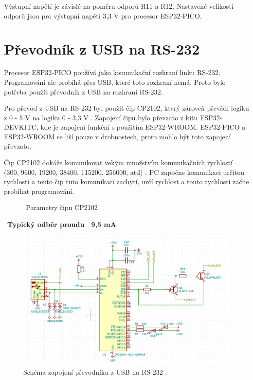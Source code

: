   Výstupní napětí je závislé na poměru odporů R11 a R12. Nastavené velikosti odporů jsou pro výstupní napětí 3,3 V pro procesor 
  ESP32-PICO.

  \section{Převodník z USB na RS-232}
  Procesor ESP32-PICO používá jako komunikační rozhraní linku RS-232. Programování ale probíhá přes USB, které toto rozhraní
  nemá. Proto bylo potřeba použít převodník z USB na rozhraní RS-232.
  
  Pro převod z USB na RS-232 byl použit čip CP2102, který  zároveň převádí logiku z 0 - 5 V na logiku 0 - 3,3 V 
  \cite{CP2102_datasheet}. Zapojení čipu bylo převzato z kitu ESP32-DEVKITC, kde je zapojení funkční s použitím ESP32-WROOM.
  ESP32-PICO a ESP32-WROOM se liší pouze v drobnostech, proto mohlo být toto zapojení převzato.

  Čip CP2102 dokáže komunikovat vekým množstvím komunikačních rychlostí (300, 9600, 19200, 38400, 115200, 256000, atd) 
  \cite{CP2102_datasheet}. PC započne komunikaci určitou rychlostí a tento čip tuto komunikaci zachytí, určí rychlost 
  a touto rychlostí začne probíhat programování.
  \begin{table}[!h]
    \caption{Parametry čipu CP2102 \cite{CP2102_datasheet}}
    \begin{center}
        \begin{tabular}{|c|c|}
            \hline
            Typický odběr proudu   & 9,5 mA \\
            \hline
        \end{tabular}    
    \end{center}
\end{table}

\begin{figure}[!h]
    \begin{center}
      \includegraphics[scale=0.6]{obrazky/CP2102_schema.png}
    \end{center}
    \caption[Schéma zapojení převodníku z USB na RS-232]{Schéma zapojení převodníku z USB na RS-232 \cite{Devkit_schema}.}
\end{figure}

